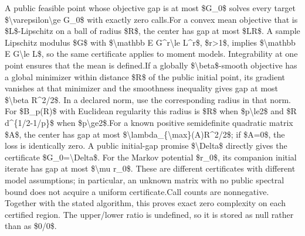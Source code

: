 \documentclass[10pt,a4paper]{article}
\begin{document}
\begingroup\raggedright\sloppy A public feasible point whose objective gap is at most \$G\_\allowbreak{}0\$ solves every target \$\textbackslash{}varepsilon\textbackslash{}ge G\_\allowbreak{}0\$ with exactly zero calls.\newline{}\newline{}For a convex mean objective that is \$L\$-Lipschitz on a ball of radius \$R\$,\allowbreak{} the center has gap at most \$LR\$. A sample Lipschitz modulus \$G\$ with \$\textbackslash{}mathbb E G\textasciicircum{}r\textbackslash{}le L\textasciicircum{}r\$,\allowbreak{} \$r>1\$,\allowbreak{} implies \$\textbackslash{}mathbb E G\textbackslash{}le L\$,\allowbreak{} so the same certificate applies to moment models. Integrability at one point ensures that the mean is defined.\newline{}\newline{}If a globally \$\textbackslash{}beta\$-smooth objective has a global minimizer within distance \$R\$ of the public initial point,\allowbreak{} its gradient vanishes at that minimizer and the smoothness inequality gives gap at most \$\textbackslash{}beta R\textasciicircum{}2/\allowbreak{}2\$. In a declared norm,\allowbreak{} use the corresponding radius in that norm. For \$B\_\allowbreak{}p(R)\$ with Euclidean regularity this radius is \$R\$ when \$p\textbackslash{}le2\$ and \$R d\textasciicircum{}\{1/\allowbreak{}2-1/\allowbreak{}p\}\$ when \$p\textbackslash{}ge2\$.\newline{}\newline{}For a known positive semidefinite quadratic matrix \$A\$,\allowbreak{} the center has gap at most \$\textbackslash{}lambda\_\allowbreak{}\{\textbackslash{}max\}(A)R\textasciicircum{}2/\allowbreak{}2\$;\allowbreak{} if \$A=\allowbreak{}0\$,\allowbreak{} the loss is identically zero. A public initial-gap promise \$\textbackslash{}Delta\$ directly gives the certificate \$G\_\allowbreak{}0=\allowbreak{}\textbackslash{}Delta\$. For the Markov potential \$r\_\allowbreak{}0\$,\allowbreak{} its companion initial iterate has gap at most \$\textbackslash{}mu r\_\allowbreak{}0\$. These are different certificates with different model assumptions;\allowbreak{} in particular,\allowbreak{} an unknown matrix with no public spectral bound does not acquire a uniform certificate.\newline{}\newline{}Call counts are nonnegative. Together with the stated algorithm,\allowbreak{} this proves exact zero complexity on each certified region. The upper/\allowbreak{}lower ratio is undefined,\allowbreak{} so it is stored as null rather than as \$0/\allowbreak{}0\$.\par\endgroup
\end{document}
